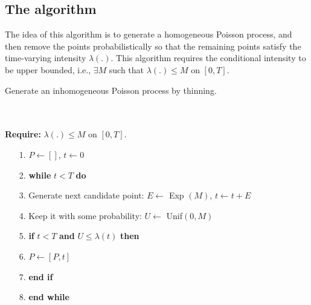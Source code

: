 \subsection{The algorithm}
The idea of this algorithm is to generate a homogeneous Poisson process, and then remove the points probabilistically so that the remaining points satisfy the time-varying intensity $\lambda(.)$. This algorithm requires the conditional intensity to be upper bounded, i.e., $\exists M$ such that $\lambda(.) \leq M$ on $[0,T]$.
\begin{breakablealgorithm}
	\caption{Generate an inhomogeneous Poisson process by thinning.}
	\label{algorithm:poison}
	\begin{algorithmic}[H]
		\noindent
		\\
		\\
		\textbf{Require:} $\lambda(.) \leq M$ on $[0,T]$.\\
		\begin{itemize}
			\item [1.] $P\leftarrow []$, $t\leftarrow0$
			\item [2.] \textbf{while} $t<T$ \textbf{do}
			\item [3.] \hspace*{.6cm}Generate next candidate point: $E \leftarrow$ Exp $(M)$,  $t \leftarrow t+E$
			\item [4.] \hspace*{.5cm} Keep it with some probability:  $U \leftarrow$ Unif$(0,M)$
			\item [5.] \hspace*{.55cm} \textbf{if} $t <T$ \textbf{and} $U \leq \lambda(t)$ \textbf{then}
			\item [6.]  \hspace*{1.2cm}$P \leftarrow [P,t]$
			\item [7.] \hspace*{.65cm}\textbf{end if}
			\item [8.] \textbf{end while}
		\end{itemize}
	\end{algorithmic} 
\end{breakablealgorithm}

